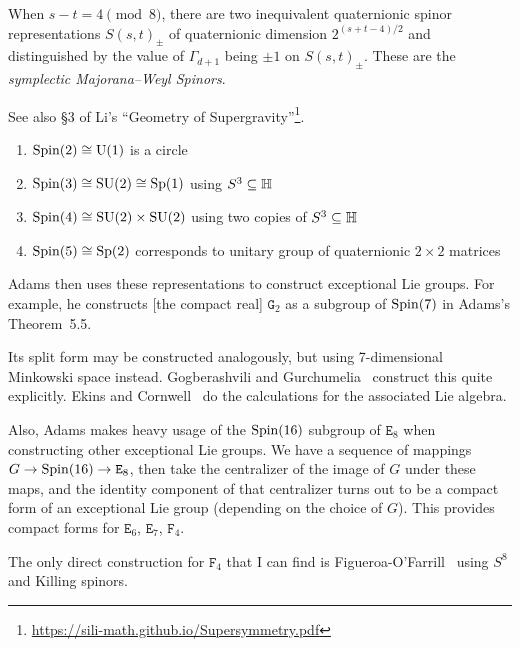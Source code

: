 When $s-t=4\pmod8$, there are two inequivalent quaternionic spinor
representations $S(s,t)_{\pm}$ of quaternionic dimension $2^{(s+t-4)/2}$
and distinguished by the value of $\Gamma_{d+1}$ being $\pm1$ on
$S(s,t)_{\pm}$.
These are the \emph{symplectic Majorana--Weyl Spinors}.

See also \S3 of Li's ``Geometry of Supergravity''\footnote{\url{https://sili-math.github.io/Supersymmetry.pdf}}.

\begin{example}
\begin{enumerate}
\item $\operatorname{Spin}(2)\cong\operatorname{U}(1)$ is a circle
\item $\operatorname{Spin}(3)\cong\operatorname{SU}(2)\cong\operatorname{Sp}(1)$ using $S^{3}\subseteq\mathbb{H}$
\item $\operatorname{Spin}(4)\cong\operatorname{SU}(2)\times\operatorname{SU}(2)$ using two copies of $S^{3}\subseteq\mathbb{H}$
\item $\operatorname{Spin}(5)\cong\operatorname{Sp}(2)$ corresponds to unitary group of quaternionic
  $2\times2$ matrices
\end{enumerate}
\end{example}

\M
Adams then uses these representations to construct exceptional Lie
groups. For example, he constructs [the compact real] $\mathtt{G}_{2}$
as a subgroup of $\operatorname{Spin}(7)$ in Adams's Theorem~5.5.

Its split form may be constructed analogously, but using 7-dimensional
Minkowski space instead.
Gogberashvili and Gurchumelia~\cite{Gogberashvili:2019ojg} construct
this quite explicitly. Ekins and Cornwell~\cite{Ekins:1975yu} do the
calculations for the associated Lie algebra.

\M
Also, Adams makes heavy usage of the $\operatorname{Spin}(16)$ subgroup of
$\mathtt{E}_{8}$ when constructing other exceptional Lie groups.
We have a sequence of mappings $G\to\operatorname{Spin}(16)\to\mathtt{E}_{8}$,
then take the centralizer of the image of $G$ under these maps, and the
identity component of that centralizer turns out to be a compact form of
an exceptional Lie group (depending on the choice of $G$).
This provides compact forms for $\mathtt{E}_{6}$, $\mathtt{E}_{7}$,
$\mathtt{F}_{4}$.

The only direct construction for $\mathtt{F}_{4}$
that I can find is Figueroa-O'Farrill~\cite{Figueroa-OFarrill:2007jcv}
using $S^{8}$ and Killing spinors.
